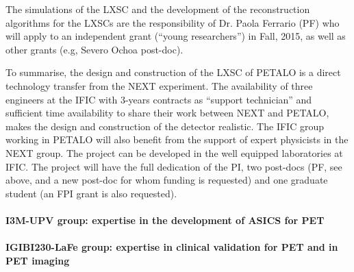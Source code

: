 The simulations of the LXSC and the development of the reconstruction algorithms for the LXSCs are the responsibility of Dr. Paola Ferrario (PF) who will apply to an independent grant (``young researchers'') in Fall, 2015, as well as other grants (e.g, Severo Ochoa post-doc). 

To summarise, the design and construction of the LXSC of PETALO is a direct technology transfer from the NEXT experiment. The availability of three engineers at the IFIC with 3-years contracts as ``support technician'' and sufficient time availability to share their work between NEXT and PETALO, makes the design and construction of the detector realistic. The IFIC group working in PETALO will also benefit from the support of expert physicists in the NEXT group. The project can be developed in the well equipped laboratories at IFIC. The project will have the full dedication of the PI, two post-docs (PF, see above, and a new post-doc for whom funding is requested) and one graduate student (an FPI grant is also requested). 

\paragraph{I3M-UPV group: expertise in the development of ASICS for PET}

\paragraph{IGIBI230-LaFe group: expertise in clinical validation for PET and in PET imaging}